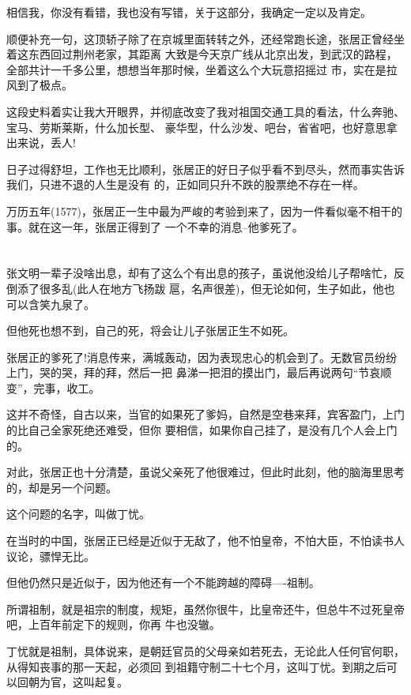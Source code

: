 \documentclass[11pt,a4paper,onecolumn]{article}
\begin{document}
相信我，你没有看错，我也没有写错，关于这部分，我确定一定以及肯定。

顺便补充一句，这顶轿子除了在京城里面转转之外，还经常跑长途，张居正曾经坐着这东西回过荆州老家，其距离
大致是今天京广线从北京出发，到武汉的路程，全部共计一千多公里，想想当年那时候，坐着这么个大玩意招摇过
市，实在是拉风到了极点。

这段史料着实让我大开眼界，并彻底改变了我对祖国交通工具的看法，什么奔驰、宝马、劳斯莱斯，什么加长型、
豪华型，什么沙发、吧台，省省吧，也好意思拿出来说，丢人!

日子过得舒坦，工作也无比顺利，张居正的好日子似乎看不到尽头，然而事实告诉我们，只进不退的人生是没有
的，正如同只升不跌的股票绝不存在一样。

万历五年(1577)，张居正一生中最为严峻的考验到来了，因为一件看似毫不相干的事。就在这一年，张居正得到了
一个不幸的消息--他爹死了。

\section[\thesection]{}

张文明一辈子没啥出息，却有了这么个有出息的孩子，虽说他没给儿子帮啥忙，反倒添了很多乱(此人在地方飞扬跋
扈，名声很差)，但无论如何，生子如此，他也可以含笑九泉了。

但他死也想不到，自己的死，将会让儿子张居正生不如死。

张居正的爹死了!消息传来，满城轰动，因为表现忠心的机会到了。无数官员纷纷上门，哭的哭，拜的拜，然后一把
鼻涕一把泪的摸出门，最后再说两句``节哀顺变''，完事，收工。

这并不奇怪，自古以来，当官的如果死了爹妈，自然是空巷来拜，宾客盈门，上门的比自己全家死绝还难受，但你
要相信，如果你自己挂了，是没有几个人会上门的。

对此，张居正也十分清楚，虽说父亲死了他很难过，但此时此刻，他的脑海里思考的，却是另一个问题。

这个问题的名字，叫做丁忧。

在当时的中国，张居正已经是近似于无敌了，他不怕皇帝，不怕大臣，不怕读书人议论，骠悍无比。

但他仍然只是近似于，因为他还有一个不能跨越的障碍----祖制。

所谓祖制，就是祖宗的制度，规矩，虽然你很牛，比皇帝还牛，但总牛不过死皇帝吧，上百年前定下的规则，你再
牛也没辙。

丁忧就是祖制，具体说来，是朝廷官员的父母亲如若死去，无论此人任何官何职，从得知丧事的那一天起，必须回
到祖籍守制二十七个月，这叫丁忧。到期之后可以回朝为官，这叫起复。
\end{document}
